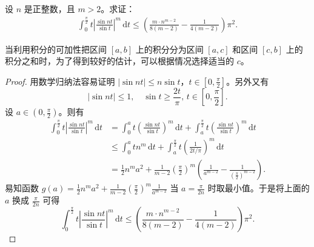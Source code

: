 \documentclass[../../main.tex]{subfiles}%
\begin{document}
\begin{example}
设 \( n \) 是正整数，且 \( m > 2 \)。求证：
\begin{align*}
\int_{0}^{\frac{\pi}{2}} t \left| \frac{\sin nt}{\sin t} \right|^m \, \mathrm{d}t \leqslant \left( \frac{m \cdot n^{m - 2}}{8(m - 2)} - \frac{1}{4(m - 2)} \right) \pi^2.
\end{align*}
\end{example}
\begin{remark}
当利用积分的可加性把区间 \( [a, b] \) 上的积分分为区间 \( [a, c] \) 和区间 \( [c, b] \) 上的积分之和时，为了得到较好的估计，可以根据情况选择适当的 \( c \)。
\end{remark}
\begin{proof}

用数学归纳法容易证明 \( |\sin nt| \leqslant n \sin t \)，\( t \in \left[ 0, \frac{\pi}{2} \right] \)。另外又有
\[
|\sin nt| \leqslant 1, \quad \sin t \geqslant \frac{2t}{\pi}, \, t \in \left[ 0, \frac{\pi}{2} \right].
\]
设 \( a \in \left( 0, \frac{\pi}{2} \right) \)。则有
\begin{align*}
\int_{0}^{\frac{\pi}{2}} t \left| \frac{\sin nt}{\sin t} \right|^m \, \mathrm{d}t &= \int_{0}^{a} t \left( \frac{\sin nt}{\sin t} \right)^m \, \mathrm{d}t + \int_{a}^{\frac{\pi}{2}} t \left( \frac{\sin nt}{\sin t} \right)^m \, \mathrm{d}t \\
&\leqslant \int_{0}^{a} tn^m \, \mathrm{d}t + \int_{a}^{\frac{\pi}{2}} t \left( \frac{1}{2t/\pi} \right)^m \, \mathrm{d}t \\
&= \frac{1}{2} n^m a^2 + \frac{1}{m - 2} \left( \frac{\pi}{2} \right)^m \left( \frac{1}{a^{m - 2}} - \frac{1}{(\frac{\pi}{2})^{m - 2}} \right).
\end{align*}
易知函数 \( g(a) = \frac{1}{2} n^m a^2 + \frac{1}{m - 2} \left( \frac{\pi}{2} \right)^m \frac{1}{a^{m - 2}} \) 当 \( a = \frac{\pi}{2n} \) 时取最小值。于是将上面的 \( a \) 换成 \( \frac{\pi}{2n} \) 可得
\[
\int_{0}^{\frac{\pi}{2}} t \left| \frac{\sin nt}{\sin t} \right|^m \, \mathrm{d}t \leqslant \left( \frac{m \cdot n^{m - 2}}{8(m - 2)} - \frac{1}{4(m - 2)} \right) \pi^2.
\]

\end{proof}
\end{document}

